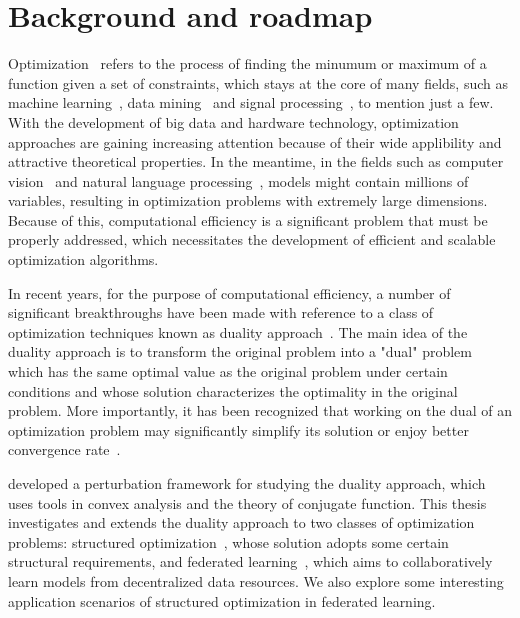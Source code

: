 \chapter{Background and roadmap}
\label{ch:Introduction}

Optimization~\citep{bert:1999} refers to the process of finding the minumum or maximum of a function given a set of constraints, which stays at the core of many fields, such as machine learning~\citep{sra2012optimization,Bubeck15}, data mining~\citep{shi2011optimization} and signal processing~\citep{mattingley2010real,palomar2010convex}, to mention just a few. With the development of big data and hardware technology, optimization approaches are gaining increasing attention because of their wide applibility and attractive theoretical properties. In the meantime, in the fields such as computer vision~\citep{krizhevsky2012imagenet} and natural language processing~\citep{wolf2020transformers}, models might contain millions of variables, resulting in optimization problems with extremely large dimensions. Because of this, computational efficiency is a significant problem that must be properly addressed, which necessitates the development of efficient and scalable optimization algorithms. 

In recent years, for the purpose of computational efficiency, a number of significant breakthroughs have been made with reference to a class of optimization techniques known as duality approach~\citep{combettes2011proximal,shalev2013stochastic,jaggi2014communication}. The main idea of the duality approach is to transform the original problem into a "dual" problem which has the same optimal value as the original problem under certain conditions and whose solution characterizes the optimality in the original problem. More importantly, it has been recognized that working on the dual of an optimization problem may significantly simplify its solution or enjoy better convergence rate~\citep{komodakis2015playing}. 

\citet{rockafellar1970convex} developed a perturbation framework for studying the duality approach, which uses tools in convex analysis and the theory of conjugate function. This thesis investigates and extends the duality approach to two classes of optimization problems: structured optimization~\citep{bach2012optimization,chandrasekaran2012convex}, whose solution adopts some certain structural requirements, and federated learning~\citep{wang2021field}, which aims to collaboratively learn models from decentralized data resources. We also explore some interesting application scenarios of structured optimization in federated learning. 

